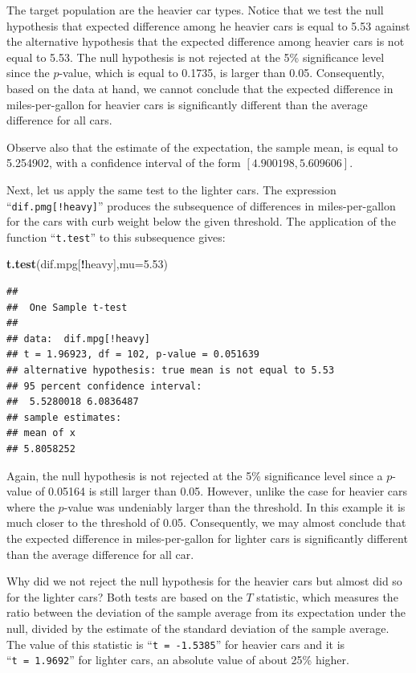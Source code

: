 \documentclass[]{krantz}
\makeatletter
\newenvironment{Shaded}{\begin{snugshade}}{\end{snugshade}}
\newcommand{\DataTypeTok}[1]{\textcolor[rgb]{0.13,0.29,0.53}{#1}}
\newcommand{\FloatTok}[1]{\textcolor[rgb]{0.00,0.00,0.81}{#1}}
\newcommand{\KeywordTok}[1]{\textcolor[rgb]{0.13,0.29,0.53}{\textbf{#1}}}
\newcommand{\NormalTok}[1]{#1}
\newcommand{\OperatorTok}[1]{\textcolor[rgb]{0.81,0.36,0.00}{\textbf{#1}}}
\newenvironment{kframe}{%
\medskip{}
\setlength{\fboxsep}{.8em}
 \def\at@end@of@kframe{}%
 \ifinner\ifhmode%
  \def\at@end@of@kframe{\end{minipage}}%
  \begin{minipage}{\columnwidth}%
 \fi\fi%
 \def\FrameCommand##1{\hskip\@totalleftmargin \hskip-\fboxsep
 \colorbox{shadecolor}{##1}\hskip-\fboxsep
     \hskip-\linewidth \hskip-\@totalleftmargin \hskip\columnwidth}%
 \MakeFramed {\advance\hsize-\width
   \@totalleftmargin\z@ \linewidth\hsize
   \@setminipage}}%
 {\par\unskip\endMakeFramed%
 \at@end@of@kframe}
\renewenvironment{Shaded}{\begin{kframe}}{\end{kframe}}
\theoremstyle{definition}
\theoremstyle{definition}
\theoremstyle{definition}
\theoremstyle{remark}
\makeatother
\begin{document}
The target population are the heavier car types. Notice that we test the
null hypothesis that expected difference among he heavier cars is equal
to 5.53 against the alternative hypothesis that the expected difference
among heavier cars is not equal to 5.53. The null hypothesis is not
rejected at the 5\% significance level since the \(p\)-value, which is
equal to 0.1735, is larger than 0.05. Consequently, based on the data at
hand, we cannot conclude that the expected difference in
miles-per-gallon for heavier cars is significantly different than the
average difference for all cars.

Observe also that the estimate of the expectation, the sample mean, is
equal to 5.254902, with a confidence interval of the form
\([4.900198, 5.609606]\).

Next, let us apply the same test to the lighter cars. The expression
``\texttt{dif.pmg{[}!heavy{]}}'' produces the subsequence of differences in
miles-per-gallon for the cars with curb weight below the given
threshold. The application of the function ``\texttt{t.test}'' to this
subsequence gives:

\begin{Shaded}
\begin{Highlighting}[]
\KeywordTok{t.test}\NormalTok{(dif.mpg[}\OperatorTok{!}\NormalTok{heavy],}\DataTypeTok{mu=}\FloatTok{5.53}\NormalTok{)}
\end{Highlighting}
\end{Shaded}

\begin{verbatim}
## 
##  One Sample t-test
## 
## data:  dif.mpg[!heavy]
## t = 1.96923, df = 102, p-value = 0.051639
## alternative hypothesis: true mean is not equal to 5.53
## 95 percent confidence interval:
##  5.5280018 6.0836487
## sample estimates:
## mean of x 
## 5.8058252
\end{verbatim}

Again, the null hypothesis is not rejected at the 5\% significance level
since a \(p\)-value of 0.05164 is still larger than 0.05. However, unlike
the case for heavier cars where the \(p\)-value was undeniably larger than
the threshold. In this example it is much closer to the threshold of
0.05. Consequently, we may almost conclude that the expected difference
in miles-per-gallon for lighter cars is significantly different than the
average difference for all car.

Why did we not reject the null hypothesis for the heavier cars but
almost did so for the lighter cars? Both tests are based on the \(T\)
statistic, which measures the ratio between the deviation of the sample
average from its expectation under the null, divided by the estimate of
the standard deviation of the sample average. The value of this
statistic is ``\texttt{t\ =\ -1.5385}'' for heavier cars and it is ``\texttt{t\ =\ 1.9692}''
for lighter cars, an absolute value of about 25\% higher.
\end{document}

